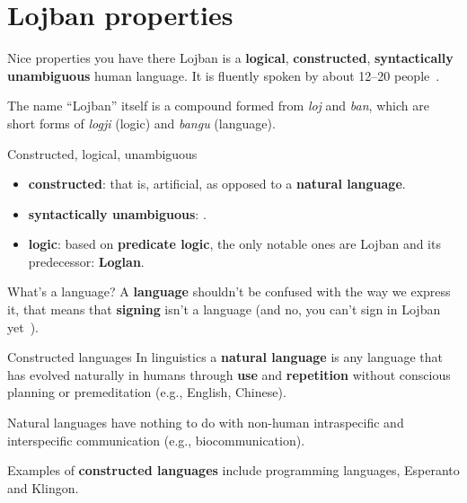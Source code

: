 \section{Lojban properties}
\begin{frame}{Nice properties you have there}
    Lojban is a \textbf{logical}, \textbf{constructed}, \textbf{syntactically unambiguous} human language. It is fluently spoken by about 12--20 people~\cite{lojban:speakers}.

    The name ``Lojban'' itself is a compound formed from \emph{loj} and \emph{ban}, which are short forms of \emph{logji} (logic) and \emph{bangu} (language).
\end{frame}

\begin{frame}{Constructed, logical, unambiguous}
    \begin{itemize}
        \item \textbf{constructed}: that is, artificial, as opposed to a \textbf{natural language}.
        \item \textbf{syntactically unambiguous}: .
        \item \textbf{logic}: based on \textbf{predicate logic}, the only notable ones are Lojban and its predecessor: \textbf{Loglan}.
    \end{itemize}
\end{frame}

\begin{frame}{What's a language?}
    A \textbf{language} shouldn't be confused with the way we express it, that means that \textbf{signing} isn't a language (and no, you can't sign in Lojban yet~\cite{lojban:signing}).
\end{frame}

\begin{frame}{Constructed languages}
    In linguistics a \textbf{natural language} is any language that has evolved naturally in humans through \textbf{use} and \textbf{repetition} without conscious planning or premeditation (e.g., English, Chinese).

    Natural languages have nothing to do with non-human intraspecific and interspecific communication (e.g., biocommunication).

    Examples of \textbf{constructed languages} include programming languages, Esperanto and Klingon.
\end{frame}

